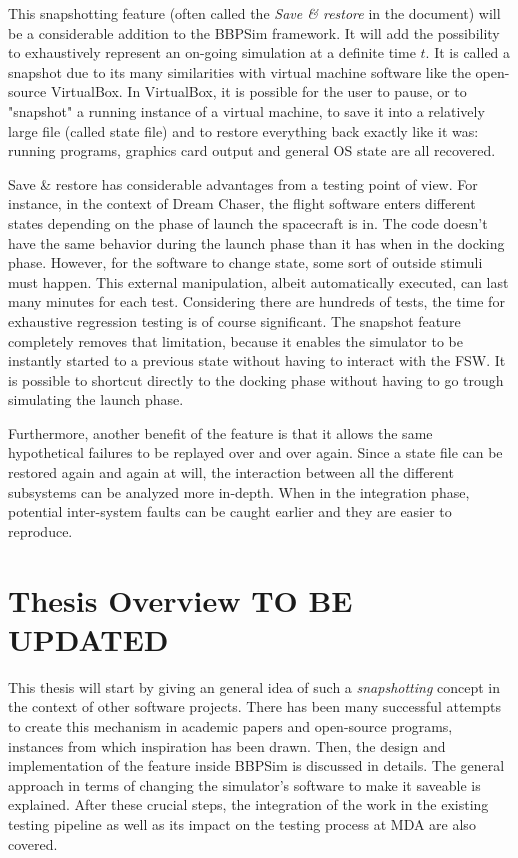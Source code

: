 This snapshotting feature (often called the \textit{Save \& restore} in the document) will be a considerable addition to the \gls{BBPSim} framework. It will add the possibility to exhaustively represent an on-going simulation at a definite time $t$. It is called a snapshot due to its many similarities with virtual machine software like the open-source VirtualBox. In VirtualBox, it is possible for the user to pause, or to "snapshot" a running instance of a virtual machine, to save it into a relatively large file (called state file) and to restore everything back exactly like it was: running programs, graphics card output and general OS state are all recovered.  

Save \& restore has considerable advantages from a testing point of view. For instance, in the context of Dream Chaser, the flight software enters different states depending on the phase of launch the spacecraft is in. The code doesn't have the same behavior during the launch phase than it has when in the docking phase. However, for the software to change state, some sort of outside stimuli must happen. This external manipulation, albeit automatically executed, can last many minutes for each test. Considering there are hundreds of tests, the time for exhaustive regression testing is of course significant. The snapshot feature completely removes that limitation, because it enables the simulator to be instantly started to a previous state without having to interact with the \gls{FSW}. It is possible to shortcut directly to the docking phase without having to go trough simulating the launch phase. 

Furthermore, another benefit of the feature is that it allows the same hypothetical failures to be replayed over and over again. Since a state file can be restored again and again at will, the interaction between all the different subsystems can be analyzed more in-depth. When in the integration phase, potential inter-system faults can be caught earlier and they are easier to reproduce.  

\section{Thesis Overview TO BE UPDATED}
This thesis will start by giving an general idea of such a \textit{snapshotting} concept in the context of other software projects. There has been many successful attempts to create this mechanism in academic papers and open-source programs, instances from which inspiration has been drawn. Then, the design and implementation of the feature inside \gls{BBPSim} is discussed in details. The general approach in terms of changing the simulator's software to make it saveable is explained. After these crucial steps, the integration of the work in the existing testing pipeline as well as its impact on the testing process at MDA are also covered. 

